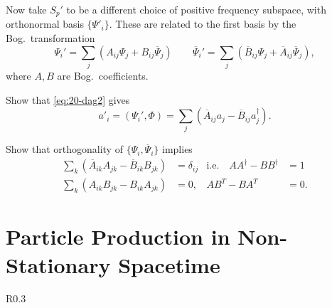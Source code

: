 Now take $S_p'$ to be a different choice of positive frequency subspace, with orthonormal basis $\{\Psi'_i\}$.
These are related to the first basis by the Bog.~transformation
\begin{equation}
  \Psi_i' = \sum_j \left( A_{ij} \Psi_{j} + B_{ij} \overline{\Psi}{}_{j} \right) \qquad
  \overline{\Psi}{}_i' = \sum_j \left( \overline{B}{}_{ij} \Psi_{j} + \overline{A}{}_{ij} \overline{\Psi}{}_{j} \right), \label{eq:20-dag2}
\end{equation}
where $A, B$ are Bog.~coefficients.
\begin{exercise}
  Show that \eqref{eq:20-dag2} gives
  \begin{equation}
    \label{eq:20-starstar}
    a'_i = (\Psi_i', \Phi) = \sum_j \left( \overline{A}{}_{ij} a_{j} - \overline{B}{}_{ij} a^{\dagger}_{j} \right).
  \end{equation}
\end{exercise}
\begin{exercise}
  Show that orthogonality of $\{\Psi_i, \overline{\Psi}{}_i\}$ implies
  \begin{align}
    \sum_k \left( \overline{A}{}_{ik} A_{jk} - \overline{B}{}_{ik} B_{jk} \right) &= \delta_{ij} & \text{i.e.}\quad A A^{\dagger} - B B^{\dagger} &= 1 \\
    \sum_k \left( A_{ik} B_{jk} - B_{ik} A_{jk} \right) &= 0, & A B^T - B A^T &= 0.
  \end{align}
\end{exercise}

\section{Particle Production in Non-Stationary Spacetime}%
\label{sec:particle_production_in_non_stationary_spacetime}

\begin{wrapfigure}{R}{0.3\textwidth}
  \centering
  \caption{}
  \label{fig:l20f1}
\end{wrapfigure}

